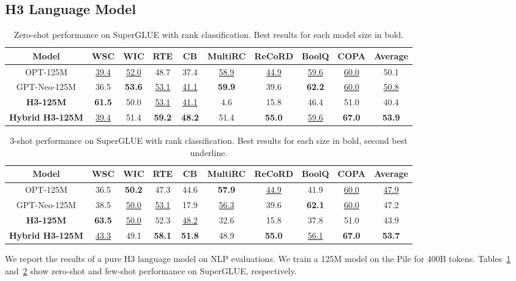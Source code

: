 \documentclass{article}
\newcommand{\hthree}{\textsc{H3}\xspace}
\begin{document}
\subsection{\hthree Language Model}
\begin{table}[ht]
\small
    \centering
\caption{\label{table:superglue_zeroshot_all} Zero-shot performance on SuperGLUE with rank classification. Best results for each model size in bold. }
{
        \begin{tabular}{@{}|c|cccccccc|c|@{}}
            \hline
Model & WSC & WIC & RTE & CB & MultiRC & ReCoRD & BoolQ & COPA & Average \\ \hline
OPT-125M & \underline{39.4} & \underline{52.0} & 48.7 & 37.4 & \underline{58.9} & \underline{44.9} & \underline{59.6} & \underline{60.0} & 50.1 \\
        GPT-Neo-125M & 36.5 & \textbf{53.6} & \underline{53.1} & \underline{41.1} & \textbf{59.9} & 39.6 & \textbf{62.2} & \underline{60.0} & \underline{50.8} \\
        \textbf{\hthree-125M} & \textbf{61.5} & 50.0 & \underline{53.1} & \underline{41.1} & 4.6 & 15.8 & 46.4 & 51.0 & 40.4 \\\textbf{Hybrid \hthree-125M} & \underline{39.4} & 51.4 & \textbf{59.2} & \textbf{48.2} & 51.4 & \textbf{55.0} & \underline{59.6} & \textbf{67.0} & \textbf{53.9} \\ \hline \end{tabular}
    }
\end{table} \begin{table}[h]
\small
    \centering
\caption{\label{table:superglue_fewshot_all} 3-shot performance on SuperGLUE with rank classification. Best results for each size in bold, second best underline. }
{
        \begin{tabular}{@{}|c|cccccccc|c|@{}}
            \hline
Model & WSC & WIC & RTE & CB & MultiRC & ReCoRD & BoolQ & COPA & Average \\ \hline
OPT-125M & 36.5 & \textbf{50.2} & 47.3 & 44.6 & \textbf{57.9} & \underline{44.9} & 41.9 & \underline{60.0} & \underline{47.9} \\
        GPT-Neo-125M & 38.5 & \underline{50.0} & \underline{53.1} & 17.9 & \underline{56.3} & 39.6 & \textbf{62.1} & \underline{60.0} & 47.2 \\
        \textbf{\hthree-125M} & \textbf{63.5} & \underline{50.0} & 52.3 & \underline{48.2} & 32.6 & 15.8 & 37.8 & 51.0 & 43.9 \\ \textbf{Hybrid \hthree-125M} & \underline{43.3} & 49.1 & \textbf{58.1} & \textbf{51.8} & 48.9 & \textbf{55.0} & \underline{56.1} & \textbf{67.0} & \textbf{53.7} \\ \hline \end{tabular}
    }
\end{table} 
We report the results of a pure \hthree language model on NLP evaluations.
We train a 125M model on the Pile for 400B tokens.
Tables~\ref{table:superglue_zeroshot_all} and~\ref{table:superglue_fewshot_all} show zero-shot and few-shot performance on SuperGLUE, respectively.
\end{document}

